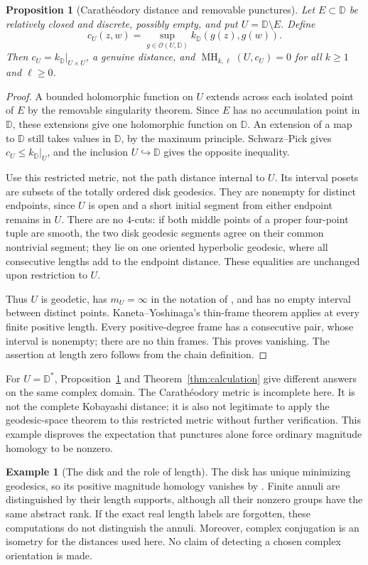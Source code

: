 \documentclass[12pt]{amsart}
\newtheorem{prop}[thm]{Proposition}
\theoremstyle{definition}
\newtheorem{eg}[thm]{Example}
\theoremstyle{remark}
\numberwithin{equation}{section}
\newcommand{\D}{\mathbb{D}}
\DeclareMathOperator{\MH}{MH}
\begin{document}
\begin{prop}[Carath\'eodory distance and removable punctures]\label{prop:caratheodory}
Let $E\subset\D$ be relatively closed and discrete, possibly empty, and put $U=\D\setminus E$. Define
\[
 c_U(z,w)=\sup_{g\in\mathcal O(U,\D)}k_{\D}(g(z),g(w)).
\]
Then $c_U=k_{\D}|_{U\times U}$, a genuine distance, and $\MH_{k,\ell}(U,c_U)=0$ for all $k\ge1$ and $\ell\ge0$.
\end{prop}
\begin{proof}
A bounded holomorphic function on $U$ extends across each isolated point of $E$ by the removable singularity theorem. Since $E$ has no accumulation point in $\D$, these extensions give one holomorphic function on $\D$. An extension of a map to $\D$ still takes values in $\D$, by the maximum principle. Schwarz--Pick gives $c_U\le k_{\D}|_U$, and the inclusion $U\hookrightarrow\D$ gives the opposite inequality.

Use this restricted metric, not the path distance internal to $U$. Its interval posets are subsets of the totally ordered disk geodesics. They are nonempty for distinct endpoints, since $U$ is open and a short initial segment from either endpoint remains in $U$. There are no $4$-cuts: if both middle points of a proper four-point tuple are smooth, the two disk geodesic segments agree on their common nontrivial segment; they lie on one oriented hyperbolic geodesic, where all consecutive lengths add to the endpoint distance. These equalities are unchanged upon restriction to $U$.

Thus $U$ is geodetic, has $m_U=\infty$ in the notation of \cite{KY}, and has no empty interval between distinct points. Kaneta--Yoshinaga's thin-frame theorem \cite[Theorem 5.2]{KY} applies at every finite positive length. Every positive-degree frame has a consecutive pair, whose interval is nonempty; there are no thin frames. This proves vanishing. The assertion at length zero follows from the chain definition.
\end{proof}
For $U=\D^*$, Proposition~\ref{prop:caratheodory} and Theorem~\ref{thm:calculation} give different answers on the same complex domain. The Carath\'eodory metric is incomplete here. It is not the complete Kobayashi distance; it is also not legitimate to apply the geodesic-space theorem to this restricted metric without further verification. This example disproves the expectation that punctures alone force ordinary magnitude homology to be nonzero.

\begin{eg}[The disk and the role of length]\label{eg:disk}
The disk has unique minimizing geodesics, so its positive magnitude homology vanishes by \cite[Corollary 5.24]{Gomi}. Finite annuli are distinguished by their length supports, although all their nonzero groups have the same abstract rank. If the exact real length labels are forgotten, these computations do not distinguish the annuli. Moreover, complex conjugation is an isometry for the distances used here. No claim of detecting a chosen complex orientation is made.
\end{eg}
\end{document}
